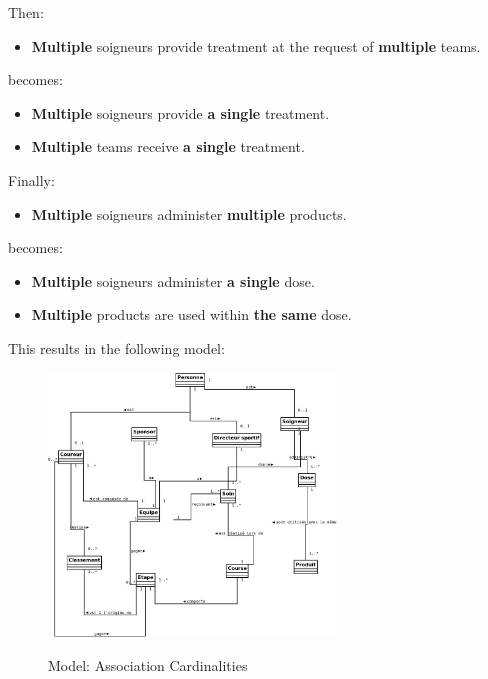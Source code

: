 Then:
\begin{itemize}
\item \textbf{Multiple} soigneurs provide treatment at the request of \textbf{multiple} teams.
\end{itemize}
becomes:
\begin{itemize}
\item \textbf{Multiple} soigneurs provide \textbf{a single} treatment.
\item \textbf{Multiple} teams receive \textbf{a single} treatment.
\end{itemize}

Finally:
\begin{itemize}
\item \textbf{Multiple} soigneurs administer \textbf{multiple} products.
\end{itemize}
becomes:
\begin{itemize}
\item \textbf{Multiple} soigneurs administer \textbf{a single} dose.
\item \textbf{Multiple} products are used within \textbf{the same} dose.
\end{itemize}

This results in the following model:

\begin{figure}[H]
\begin{center}
\includegraphics[height=7cm]{img/Figure3.jpg}\\
\caption{Model: Association Cardinalities}
\label{fig4}
\end{center}
\end{figure}
